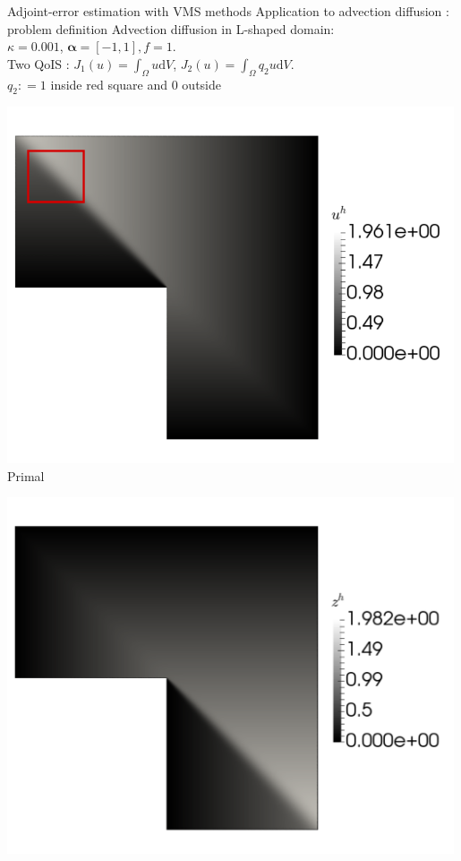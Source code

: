 \documentclass[fleqn]{beamer}
\newcommand{\bs}[1]{\boldsymbol{#1}}
\begin{document}

\begin{frame}{Adjoint-error estimation with VMS methods}
{Application to advection diffusion : problem definition}
\vspace*{-1em}
Advection diffusion in L-shaped domain: \\
$\kappa = 0.001$, $\bs{\alpha} = [-1,1], f= 1$. \\ [8pt]
Two QoIS : $J_1(u) = \int_{\Omega} u \text{d} V$,   $J_2(u) = \int_{\Omega} q_2 u \text{d} V$. \\ [8pt]
$q_2 : = 1$ inside red square and $0$ outside \\ [8pt]
\begin{minipage}{0.33\textwidth}
\centering
\includegraphics[width=0.99\textwidth]{../img/defend_lshape_uh} \\
Primal
\end{minipage}%
\begin{minipage}{0.33\textwidth}
\centering
\includegraphics[width=0.99\textwidth]{../img/vms_lshape_global_zh} \\

\end{minipage}
\end{frame}
\end{document}
